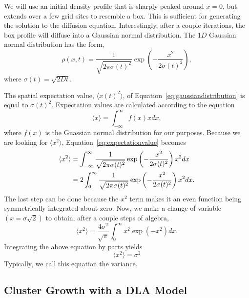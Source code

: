 \documentclass[12pt]{article}
\begin{document}
We will use an initial density profile that is sharply peaked around $x=0$, but extends over a few grid sites to resemble a box. This is sufficient for generating the solution to the diffusion equation. Interestingly, after a couple iterations, the box profile will diffuse into a Gaussian normal distribution. The $1D$ Gaussian normal distribution has the form,
\begin{equation}
  \label{eq:gaussiandistribution}
  \rho(x,t) = \frac{1}{\sqrt{2\pi\sigma(t)^2}}\exp\left(-\frac{x^2}{2\sigma(t)^2}\right),
\end{equation}
where $\sigma(t) = \sqrt{2Dt}$.

The spatial expectation value, $\langle x(t)^2\rangle$, of Equation~\ref{eq:gaussiandistribution} is equal to $\sigma(t)^2$. Expectation values are calculated according to the equation
\begin{equation}
  \label{eq:expectationvalue}
  \langle x\rangle = \int_{-\infty}^\infty f(x)xdx,
\end{equation}
where $f(x)$ is the Guassian normal distribution for our purposes. Because we are looking for $\langle x^2\rangle$, Equation~\ref{eq:expectationvalue} becomes
\begin{align}
  \label{eq:spatialexpectationvalueintegral}
  \langle x^2\rangle &= \int_{-\infty}^\infty \frac{1}{\sqrt{2\pi\sigma(t)^2}}\exp\left(-\frac{x^2}{2\sigma(t)^2}\right) x^2 dx \notag \\
  &= 2\int_{0}^\infty \frac{1}{\sqrt{2\pi\sigma(t)^2}}\exp\left(-\frac{x^2}{2\sigma(t)^2}\right) x^2 dx.
\end{align}
The last step can be done because the $x^2$ term makes it an even function being symmetrically integrated about zero. Now, we make a change of variable $(x=\sigma\sqrt{2})$ to obtain, after a couple steps of algebra,
\begin{equation}
  \label{eq:spatialexpectationvalue-simplified}
  \langle x^2\rangle = \frac{4\sigma^2}{\sqrt{\pi}}\int_0^\infty x^2 \exp(-x^2)dx.
\end{equation}
Integrating the above equation by parts yields
\begin{equation}
  \label{eq:variancesolved}
  \langle x^2 \rangle = \sigma^2
\end{equation}
Typically, we call this equation the variance. %

\subsection{Cluster Growth with a DLA Model}
\label{sec:clusterDLAmodel}
\end{document}
